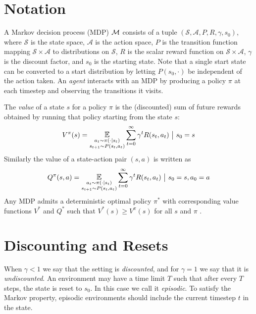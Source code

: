 \section{Notation}

A Markov decision process (MDP) $\mathcal{M}$ consists of a tuple $(\mathcal{S}, \mathcal{A}, P, R, \gamma, s_0)$, where $\mathcal{S}$ is the state space, $\mathcal{A}$ is the action space, $P$ is the transition function mapping $\mathcal{S} \times \mathcal{A}$ to distributions on $\mathcal{S}$, $R$ is the scalar reward function on $\mathcal{S} \times \mathcal{A}$, $\gamma$ is the discount factor, and $s_0$ is the starting state.
Note that a single start state can be converted to a start distribution by letting $P(s_0, \cdot)$ be independent of the action taken.
An \emph{agent} interacts with an MDP by producing a policy $\pi$ at each timestep and observing the transitions it visits.

The \emph{value} of a state $s$ for a policy $\pi$ is the (discounted) sum of future rewards obtained by running that policy starting from the state $s$:
\begin{align}
    V^{\pi}(s) = \E_{\substack{a_t \sim \pi(\cdot \mid s_t) \\ s_{t+1} \sim P(s_t, a_t)}} \sum_{t=0}^\infty \gamma^t R(s_t, a_t) ~\big|~ s_0=s
\end{align}
Similarly the value of a state-action pair $(s, a)$ is written as
\begin{align}
    Q^{\pi}(s, a) = \E_{\substack{a_t \sim \pi(\cdot \mid s_t) \\ s_{t+1} \sim P(s_t, a_t)}} \sum_{t=0}^\infty \gamma^t R(s_t, a_t) ~\big|~ s_0=s, a_0 = a
\end{align}
Any MDP admits a deterministic optimal policy $\pi^*$ with corresponding value functions $V^*$ and $Q^*$ such that $V^*(s) \ge V^\pi(s)$ for all $s$ and $\pi$ \citep{sutton2018reinforcement}.


\section{Discounting and Resets}

When $\gamma < 1$ we say that the setting is \emph{discounted}, and for $\gamma = 1$ we say that it is \emph{undiscounted}.
An environment may have a time limit $T$ such that after every $T$ steps, the state is reset to $s_0$.
In this case we call it \emph{episodic}.
To satisfy the Markov property, episodic environments should include the current timestep $t$ in the state.

